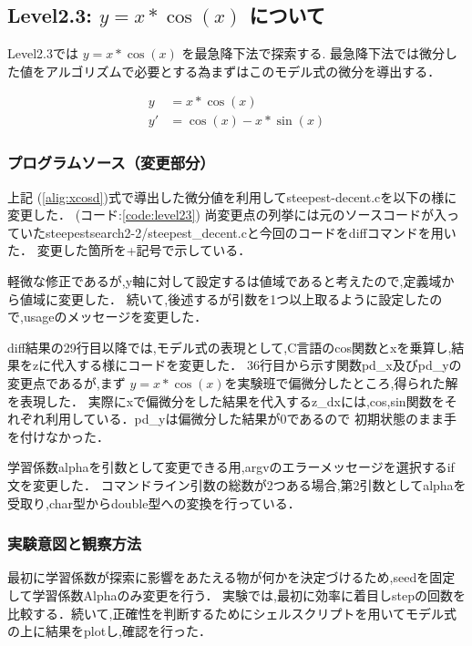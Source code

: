 \subsection{Level2.3: $y=x*\cos(x)$ について}
Level2.3では $y=x*\cos(x)$ を最急降下法で探索する.
最急降下法では微分した値をアルゴリズムで必要とする為まずはこのモデル式の微分を導出する．

\begin{align}
    y &= x * \cos(x) \label{alig:cos}\\
    y' &= \cos(x) - x * \sin(x)
    \label{alig:xcosd}
\end{align}


\subsubsection{プログラムソース（変更部分）}

上記 (\ref{alig:xcosd})式で導出した微分値を利用してsteepest-decent.cを以下の様に変更した． (コード:\ref{code:level23})
尚変更点の列挙には元のソースコードが入っていたsteepestsearch2-2/steepest\_decent.cと今回のコードをdiffコマンドを用いた．
変更した箇所を+記号で示している．


軽微な修正であるが,y軸に対して設定するは値域であると考えたので,定義域から値域に変更した．
続いて,後述するが引数を1つ以上取るように設定したので,usageのメッセージを変更した．

diff結果の29行目以降では,モデル式の表現として,C言語のcos関数とxを乗算し,結果をzに代入する様にコードを変更した．
36行目から示す関数pd\_x及びpd\_yの変更点であるが,まず $y=x* \cos(x)$を実験班で偏微分したところ,得られた解を表現した．
実際にxで偏微分をした結果を代入するz\_dxには,cos,sin関数をそれぞれ利用している．pd\_yは偏微分した結果が0であるので
初期状態のまま手を付けなかった．


学習係数alphaを引数として変更できる用,argvのエラーメッセージを選択するif文を変更した．
コマンドライン引数の総数が2つある場合,第2引数としてalphaを受取り,char型からdouble型への変換を行っている．


\subsubsection{実験意図と観察方法}
最初に学習係数が探索に影響をあたえる物が何かを決定づけるため,seedを固定して学習係数Alphaのみ変更を行う．
実験では,最初に効率に着目しstepの回数を比較する．続いて,正確性を判断するためにシェルスクリプトを用いてモデル式の上に結果をplotし,確認を行った．

